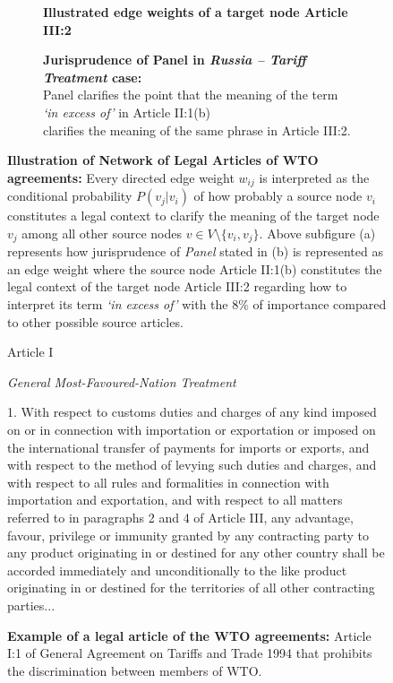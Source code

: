 \begin{figure}[]
    \captionsetup[subfigure]{justification=centering}
    \begin{subfigure}[b]{1\textwidth}
        \centering{
            
        }
        \caption{\textbf{Illustrated edge weights of a target node Article III:2}}
        \label{subfig:a:art2b}
    \end{subfigure}
    \vfill
    \begin{subfigure}[b]{1\textwidth}
        \centering{
            
        }
        \centering
        \caption{\textbf{Jurisprudence of Panel in \textit{Russia – Tariff Treatment} case:} \\ Panel clarifies the point that the meaning of the term \textit{`in excess of'} in Article II:1(b) \\ clarifies the meaning of the same phrase in Article III:2.}
        \label{subfig:a:condprob}
    \end{subfigure}
    \caption{\textbf{Illustration of Network of Legal Articles of WTO agreements: }Every directed edge weight $w_{ij}$ is interpreted as the conditional probability $P(v_j|v_i)$ of how probably a source node $v_i$ constitutes a legal context to clarify the meaning of the target node $v_j$ among all other source nodes $v\in V \setminus \{v_i, v_{j}\}$. Above subfigure (a) represents how jurisprudence of \textit{Panel} stated in (b) is represented as an edge weight where the source node Article II:1(b) constitutes the legal context of the target node Article III:2 regarding how to interpret its term \textit{`in excess of'} with the $8\%$ of importance compared to other possible source articles.}
    \label{fig:def-example}
\end{figure}



\begin{figure}[]
    \begin{center}
        Article I
    \end{center}
    \begin{center}
        \textit{General Most-Favoured-Nation Treatment}
    \end{center}
    1. With respect to customs duties and charges of any kind imposed on or in connection
    with importation or exportation or imposed on the international transfer of payments for
    imports or exports, and with respect to the method of levying such duties and charges, and
    with respect to all rules and formalities in connection with importation and exportation, and
    with respect to all matters referred to in paragraphs 2 and 4 of Article III, any advantage,
    favour, privilege or immunity granted by any contracting party to any product originating in
    or destined for any other country shall be accorded immediately and unconditionally to the
    like product originating in or destined for the territories of all other contracting parties...
    \caption{\textbf{Example of a legal article of the WTO agreements:} Article I:1 of General Agreement on Tariffs and Trade 1994 that prohibits the discrimination between members of WTO.}
    \label{fig:gatt_art1}
\end{figure}
